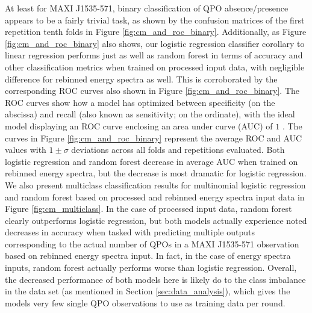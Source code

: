 \documentclass[fleqn,usenatbib,twocolumn]{mnras}%
\begin{document}
At least for MAXI J1535-571, binary classification of QPO absence/presence appears to be a fairly trivial task, as shown by the confusion matrices of the first repetition tenth folds in Figure \ref{fig:cm_and_roc_binary}. Additionally, as Figure \ref{fig:cm_and_roc_binary} also shows, our logistic regression classifier corollary to linear regression performs just as well as random forest in terms of accuracy and other classification metrics when trained on processed input data, with negligible difference for rebinned energy spectra as well. This is corroborated by the corresponding ROC curves also shown in Figure \ref{fig:cm_and_roc_binary}. The ROC curves show how a model has optimized between specificity (on the abscissa) and recall (also known as sensitivity; on the ordinate), with the ideal model displaying an ROC curve enclosing an area under curve (AUC) of $1$ \citep{bruce2017practical}. The curves in Figure \ref{fig:cm_and_roc_binary} represent the average ROC and AUC values with $1\pm\sigma$ deviations across all folds and repetitions evaluated. Both logistic regression and random forest decrease in average AUC when trained on rebinned energy spectra, but the decrease is most dramatic for logistic regression. We also present multiclass classification results for multinomial logistic regression and random forest based on processed and rebinned energy spectra input data in Figure \ref{fig:cm_multiclass}. In the case of processed input data, random forest clearly outperforms logistic regression, but both models actually experience noted decreases in accuracy when tasked with predicting multiple outputs corresponding to the actual number of QPOs in a MAXI J1535-571 observation based on rebinned energy spectra input. In fact, in the case of energy spectra inputs, random forest actually performs worse than logistic regression. Overall, the decreased performance of both models here is likely do to the class imbalance in the data set (as mentioned in Section \ref{sec:data_analysis}), which gives the models very few single QPO observations to use as training data per round. 
\end{document}
